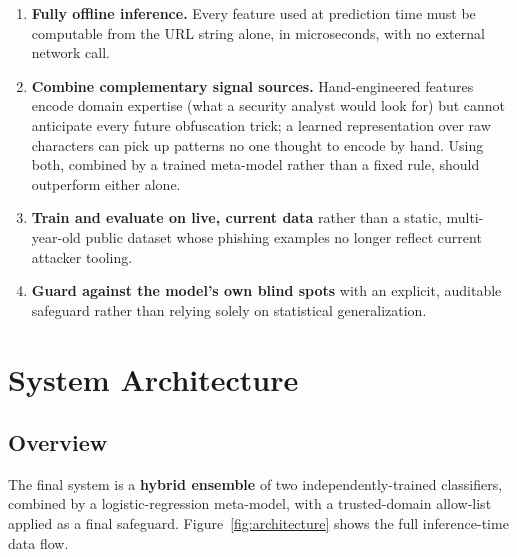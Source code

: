 \documentclass[11pt,a4paper]{report}
\begin{document}
\begin{enumerate}[leftmargin=1.4em]
  \item \textbf{Fully offline inference.} Every feature used at prediction time
  must be computable from the URL string alone, in microseconds, with no external
  network call.
  \item \textbf{Combine complementary signal sources.} Hand-engineered features
  encode domain expertise (what a security analyst would look for) but cannot
  anticipate every future obfuscation trick; a learned representation over raw
  characters can pick up patterns no one thought to encode by hand. Using both,
  combined by a trained meta-model rather than a fixed rule, should outperform either
  alone.
  \item \textbf{Train and evaluate on live, current data} rather than a static,
  multi-year-old public dataset whose phishing examples no longer reflect current
  attacker tooling.
  \item \textbf{Guard against the model's own blind spots} with an explicit,
  auditable safeguard rather than relying solely on statistical generalization.
\end{enumerate}

\chapter{System Architecture}

\section{Overview}
The final system is a \textbf{hybrid ensemble} of two independently-trained
classifiers, combined by a logistic-regression meta-model, with a trusted-domain
allow-list applied as a final safeguard. Figure~\ref{fig:architecture} shows the full
inference-time data flow.
\end{document}
